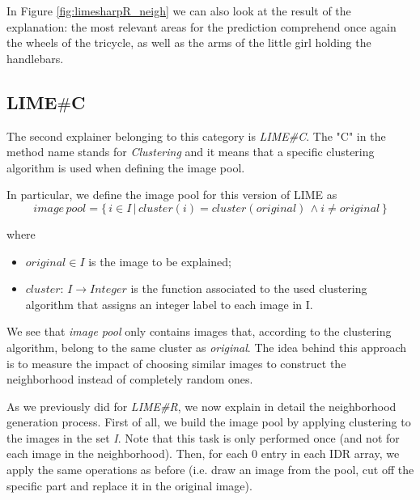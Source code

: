 \documentclass[12pt, twoside, a4paper]{report}
\begin{document}

In Figure \ref{fig:limesharpR_neigh} we can also look at the result of the explanation: the most relevant areas for the prediction comprehend once again the wheels of the tricycle, as well as the arms of the little girl holding the handlebars.


\subsection{LIME$\#$C}

The second explainer belonging to this category is \textit{LIME\#C}. The "C" in the method name stands for \textit{Clustering} and it means that a specific clustering algorithm is used when defining the image pool.

In particular, we define the image pool for this version of LIME as 
\begin{equation}\label{eqn:limesharpC_pool}
image\,pool = \{\,i \in I\, |\, cluster(i) = cluster(original)\, \land i \neq original \,\}
\end{equation}

\noindent
where 

\begin{itemize}
\item $original \in I$ is the image to be explained;
\item $cluster:\, I \rightarrow Integer$ is the function associated to the used clustering algorithm that assigns an integer label to each image in I.
\end{itemize}

We see that \textit{image pool} only contains images that, according to the clustering algorithm, belong to the same cluster as \textit{original}. The idea behind this approach is to measure the impact of choosing similar images to construct the neighborhood instead of completely random ones.

As we previously did for \textit{LIME\#R}, we now explain in detail the neighborhood generation process. First of all, we build the image pool by applying clustering to the images in the set \textit{I}. Note that this task is only performed once (and not for each image in the neighborhood).
Then, for each 0 entry in each IDR array, we apply the same operations as before (i.e. draw an image from the pool, cut off the specific part and replace it in the original image).
\end{document}
